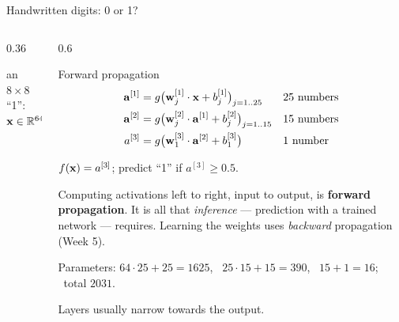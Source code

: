 \documentclass[aspectratio=169,10pt]{beamer}
\begin{document}
\begin{frame}{Handwritten digits: 0 or 1?}
  \begin{columns}[T,onlytextwidth]
    \begin{column}{0.36\textwidth}
      \centering
      \par
      {\scriptsize an $8\times8$ ``1'': $\mathbf{x}\in\mathbb{R}^{64}$}
      \vspace{2mm}

    \end{column}
    \begin{column}{0.6\textwidth}
      \footnotesize
      \begin{block}{Forward propagation}
        \vspace{-2mm}
        \begin{align*}
          \mathbf{a}^{[1]} &= g\bigl(\mathbf{w}^{[1]}_j\cdot\mathbf{x} + b^{[1]}_j\bigr)_{j=1..25}
             && \text{25 numbers}\\
          \mathbf{a}^{[2]} &= g\bigl(\mathbf{w}^{[2]}_j\cdot\mathbf{a}^{[1]} + b^{[2]}_j\bigr)_{j=1..15}
             && \text{15 numbers}\\
          a^{[3]} &= g\bigl(\mathbf{w}^{[3]}_1\cdot\mathbf{a}^{[2]} + b^{[3]}_1\bigr)
             && \text{1 number}
        \end{align*}
        \vspace{-4mm}

        $f(\mathbf{x})=a^{[3]}$; predict ``1'' if $a^{[3]}\ge0.5$.
      \end{block}
      \begin{keyidea}[Inference]
        Computing activations left to right, input to output, is \textbf{forward
        propagation}. It is all that \emph{inference} --- prediction with a trained network
        --- requires. Learning the weights uses \emph{backward} propagation (Week 5).
      \end{keyidea}
      Parameters: $64\cdot25+25=1625$, \ $25\cdot15+15=390$, \ $15+1=16$; \ total $2031$.\par
      Layers usually narrow towards the output.
    \end{column}
  \end{columns}
\end{frame}
\end{document}
